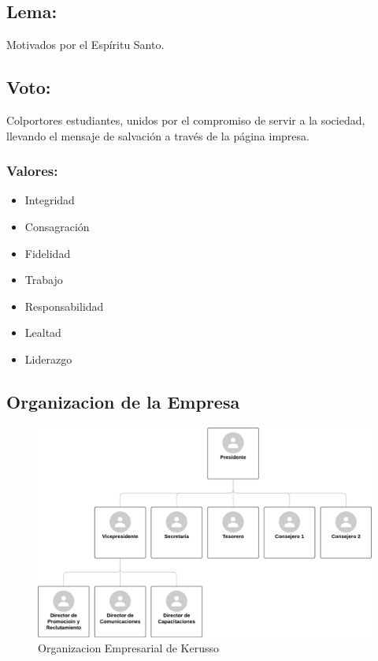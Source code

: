 \documentclass[runningheads]{llncs}
\begin{document}
\subsection*{Lema: }
Motivados por el Espíritu Santo.
\subsection*{Voto:} 
Colportores estudiantes, unidos por el compromiso de servir a la sociedad, llevando el mensaje de salvación a través de la página impresa.
\subsubsection*{Valores: }
\begin{itemize}
    \item Integridad
    \item Consagración
    \item Fidelidad
    \item Trabajo
    \item Responsabilidad
    \item Lealtad
    \item Liderazgo
\end{itemize}

\subsection{Organizacion  de la Empresa}
\begin{figure}[H]
	\centering\captionsetup{width=0.8\textwidth}
	\includegraphics[width=1\textwidth]{figures/Organigrama.png}
	\caption{Organizacion Empresarial de Kerusso} \label{fig1}
\end{figure}
\end{document}
